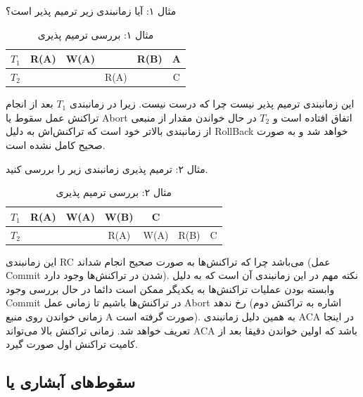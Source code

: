 \documentclass[a4paper]{article}
\begin{document}
مثال ۱: آیا زمانبندی زیر ترمیم پذیر است؟

\begin{LTR}
    \begin{table}[h]
        \centering
        \begin{RTL}
            \caption{مثال ۱: بررسی ترمیم پذیری}
        \end{RTL}
        \begin{tabular}{c|c|c|c|c|c}
            $T_{1}$ & R(A) & W(A) & & R(B) & A \\ \hline
            $T_{2}$ & & & R(A) & & C \\
        \end{tabular}
    \end{table}
\end{LTR}

این زمانبندی ترمیم پذیر نیست چرا که درست نیست. زیرا در زمانبندی $T_{1}$ بعد از
انجام تراکنش عمل سقوط یا Abort اتفاق افتاده است و $T_{2}$ در حال خواندن مقدار از
منبعی از زمانبندی بالاتر خود است که تراکنش‌اش به دلیل  RollBack
خواهد شد و به صورت صحیح کامل نشده است.

مثال ۲: ترمیم پذیری زمانبندی زیر را بررسی کنید.

\begin{LTR}
    \begin{table}[h]
        \centering
        \begin{RTL}
            \caption{مثال ۲: بررسی ترمیم پذیری}
        \end{RTL}
        \begin{tabular}{c|c|c|c|c|c|c}
            $T_{1}$ & R(A) & W(A) & W(B) & C & \\ \hline
            $T_{2}$ & & & R(A) & W(A) & R(B) & C \\
        \end{tabular}
    \end{table}
\end{LTR}

این زمانبندی RC می‌باشد چرا که تراکنش‌ها به صورت صحیح انجام شد‌اند (عمل Commit
شدن در تراکنش‌ها وجود دارد). نکته مهم در این زمانبندی آن است که به دلیل وابسته
بودن عملیات تراکنش‌ها به یکدیگر ممکن است دائما در حال بررسی وجود Commit در
تراکنش‌ها باشیم تا زمانی عمل Abort رخ ندهد (اشاره به تراکنش دوم زمانی خواندن روی
منبع A صورت گرفته است). به همین دلیل زمانبندی ACA در اینجا تعریف خواهد شد. زمانی
تراکنش بالا می‌تواند ACA باشد که اولین خواندن دقیقا بعد از کامیت تراکنش اول صورت
گیرد.

\subsection{سقوط‌های آبشاری یا }
\end{document}
